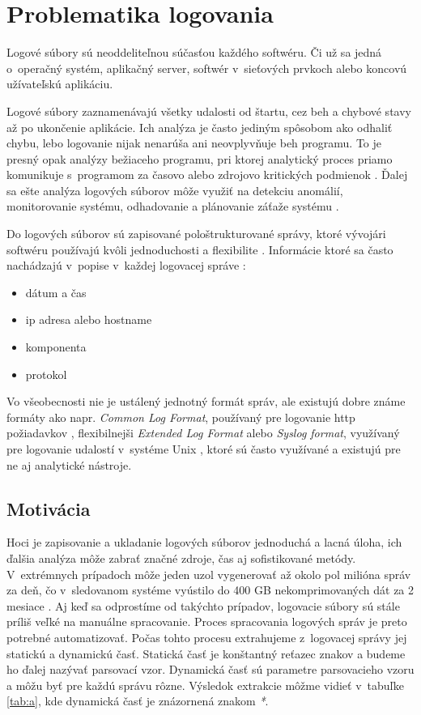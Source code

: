 \chapter{Problematika logovania}

Logové súbory sú neoddeliteľnou súčasťou každého softwéru. Či už sa jedná o~operačný systém, aplikačný server, softwér v~sieťových prvkoch alebo koncovú užívateľskú aplikáciu. 
\par Logové súbory zaznamenávajú všetky udalosti od štartu, cez beh a chybové stavy až po ukončenie aplikácie. Ich analýza je často jediným spôsobom ako odhaliť chybu, lebo logovanie nijak nenarúša ani neovplyvňuje beh programu. To je presný opak analýzy bežiaceho programu, pri ktorej analytický proces priamo komunikuje s~programom za časovo alebo zdrojovo kritických podmienok  \parencite{jvaldman} . Ďalej sa ešte analýza logových súborov môže využiť na detekciu anomálií, monitorovanie systému, odhadovanie a plánovanie záťaže systému \parencite{logengineering}.
\par Do logových súborov sú zapisované pološtrukturované správy, ktoré vývojári softwéru používajú kvôli jednoduchosti a flexibilite \parencite{he2016, ibm}. Informácie ktoré sa často nachádzajú v~popise v~každej logovacej správe \parencite{weblog, datapreprocessing, sshd}:
\begin{itemize}
  \item dátum a čas
  \item ip adresa alebo hostname
  \item komponenta
  \item protokol
\end{itemize}
\par Vo všeobecnosti nie je ustálený jednotný formát správ, ale existujú dobre známe formáty ako napr. \emph{Common Log Format}, používaný pre logovanie http požiadavkov \parencite{CLF} , flexibilnejši \emph{Extended Log Format} \parencite{ELF} alebo \emph{Syslog format}, využívaný pre logovanie udalostí v~systéme Unix \parencite{syslog}, ktoré sú často využívané a existujú pre ne aj analytické nástroje. \

\section{Motivácia}

\par Hoci je zapisovanie a ukladanie logových súborov jednoduchá a lacná úloha, ich ďalšia analýza môže zabrať značné zdroje, čas aj sofistikované metódy. V~extrémnych prípadoch môže jeden uzol vygenerovať až okolo pol milióna správ za deň, čo v~sledovanom systéme vyústilo do 400 GB nekomprimovaných dát za 2 mesiace \parencite{google}. Aj keď sa odprostíme od takýchto prípadov, logovacie súbory sú stále príliš veľké na manuálne spracovanie.  Proces spracovania logových správ je preto potrebné  automatizovať. Počas tohto procesu extrahujeme z~logovacej správy jej statickú a dynamickú časť. Statická časť je konštantný reťazec znakov a budeme ho ďalej nazývať parsovací vzor. Dynamická časť sú parametre parsovacieho vzoru a môžu byť pre každú správu rôzne. Výsledok extrakcie môžme vidieť v~tabuľke \ref{tab:a}, kde dynamická časť je znázornená znakom \emph{*}. 

